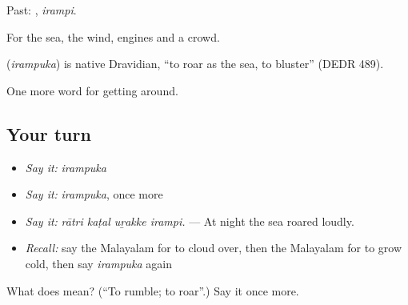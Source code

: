 Past: , \emph{irampi}.

For the sea, the wind, engines and a crowd.

\begin{cousinweb}
\textbf{} (\emph{irampuka}) is native Dravidian, \textquotedblleft{}to roar as the sea, to bluster\textquotedblright{} (DEDR 489).
\end{cousinweb}

\begin{grammarlens}[title={What you've built}]
One more word for getting around.
\end{grammarlens}

\subsection*{Your turn}
\begin{itemize}
\raggedright
  \item \emph{Say it:} \emph{irampuka}
  \item \emph{Say it:} \emph{irampuka}, once more
  \item \emph{Say it:} \emph{rātri kaṭal uṟakke irampi.} — At night the sea roared loudly.
  \item \emph{Recall:} say the Malayalam for to cloud over, then the Malayalam for to grow cold, then say \emph{irampuka} again
\end{itemize}

\begin{tcolorbox}[breakable,colback=teal!4,colframe=teal!35!black,title={Before you move on}]
What does  mean? (\textquotedblleft{}To rumble; to roar\textquotedblright{}.) Say it once more.
\end{tcolorbox}
